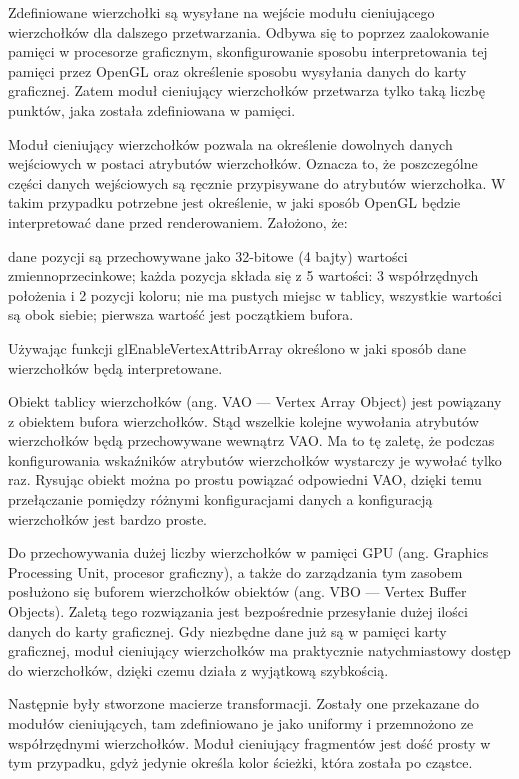 Zdefiniowane wierzchołki są wysyłane na wejście modułu cieniującego wierzchołków dla dalszego przetwarzania. Odbywa się to poprzez zaalokowanie pamięci w procesorze graficznym, skonfigurowanie sposobu interpretowania tej pamięci przez OpenGL oraz określenie sposobu wysyłania danych do karty graficznej. Zatem moduł cieniujący wierzchołków przetwarza tylko taką liczbę punktów, jaka została zdefiniowana w pamięci.

Moduł cieniujący wierzchołków pozwala na określenie dowolnych danych wejściowych w postaci atrybutów wierzchołków. Oznacza to, że poszczególne części danych wejściowych są ręcznie przypisywane do atrybutów wierzchołka. W takim przypadku potrzebne jest określenie, w jaki sposób OpenGL będzie interpretować dane przed renderowaniem. Założono, że:
\begin{itemize}
\itemi dane pozycji są przechowywane jako 32-bitowe (4 bajty) wartości zmiennoprzecinkowe;
\itemi każda pozycja składa się z 5 wartości: 3 współrzędnych położenia i 2 pozycji koloru;
\itemi nie ma pustych miejsc w tablicy, wszystkie wartości są obok siebie;
\itemi pierwsza wartość jest początkiem bufora.
\end{itemize}
Używając funkcji glEnableVertexAttribArray określono w jaki sposób dane wierzchołków będą interpretowane.

Obiekt tablicy wierzchołków (ang. VAO --- Vertex Array Object) jest powiązany z obiektem bufora wierzchołków. Stąd wszelkie kolejne wywołania atrybutów wierzchołków będą przechowywane wewnątrz VAO. Ma to tę zaletę, że podczas konfigurowania wskaźników atrybutów wierzchołków wystarczy je wywołać tylko raz. Rysując obiekt można po prostu powiązać odpowiedni VAO, dzięki temu przełączanie pomiędzy różnymi konfiguracjami danych a konfiguracją wierzchołków jest bardzo proste.

Do przechowywania dużej liczby wierzchołków w pamięci GPU (ang. Graphics Processing Unit, procesor graficzny), a także do zarządzania tym zasobem posłużono się buforem wierzchołków obiektów (ang. VBO --- Vertex Buffer Objects). Zaletą tego rozwiązania jest bezpośrednie przesyłanie dużej ilości danych do karty graficznej. Gdy niezbędne dane już są w pamięci karty graficznej, moduł cieniujący wierzchołków ma praktycznie natychmiastowy dostęp do wierzchołków, dzięki czemu działa z wyjątkową szybkością. 

Następnie były stworzone macierze transformacji. Zostały one przekazane do modułów cieniujących, tam zdefiniowano je jako uniformy i przemnożono ze współrzędnymi wierzchołków. Moduł cieniujący fragmentów jest dość prosty w tym przypadku, gdyż jedynie określa kolor ścieżki, która została po cząstce.

